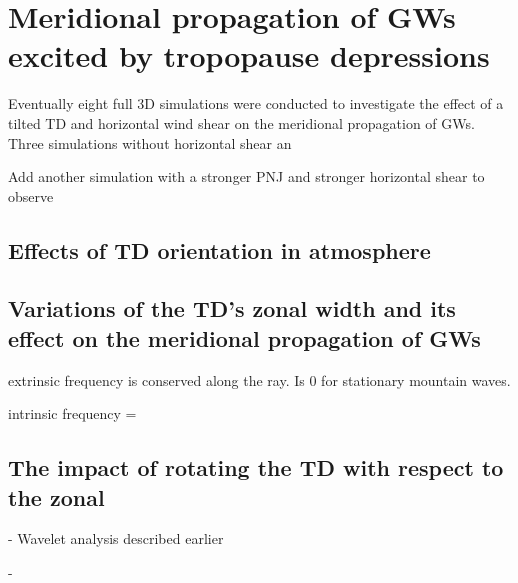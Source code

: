 \chapter{Meridional propagation of GWs excited by tropopause depressions}
\label{sec:results3D}

Eventually eight full 3D simulations were conducted to investigate the effect of a tilted TD and horizontal wind shear on the meridional propagation of GWs.
Three simulations without horizontal shear an


Add another simulation with a stronger PNJ and stronger horizontal shear to observe 
\section{Effects of TD orientation in atmosphere}


\section{Variations of the TD's zonal width and its effect on the meridional propagation of GWs}

extrinsic frequency is conserved along the ray. Is 0 for stationary mountain waves.

intrinsic frequency = 




\section{The impact of rotating the TD with respect to the zonal}

- Wavelet analysis described earlier

- 

